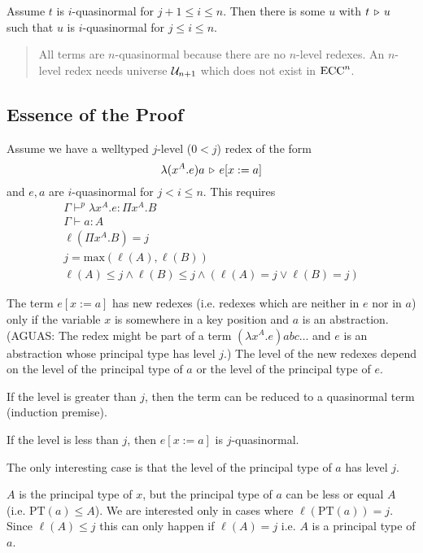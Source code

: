Assume $t$ is $i$-quasinormal for $j+1 \le i \le n$. Then there is some $u$
with $t \,\triangleright\, u$ such that $u$ is $i$-quasinormal for $j \le i \le n$.

\begin{quote}
  All terms are $n$-quasinormal because there are no $n$-level redexes. An
  $n$-level redex needs universe ${\cal U}_{n+1}$ which does not exist in $\text{ECC}^n$.
\end{quote}


\subsection{Essence of the Proof}

Assume we have a welltyped $j$-level ($0 < j$) redex of the form
$$
\lambda (x^A.e) a \,\triangleright\, e[x:=a]
$$
and $e,a$ are $i$-quasinormal for $j < i \le n$. This requires
$$
\begin{array}{l}
  \Gamma \vdash^p \lambda x^A.e : \Pi x^A.B
  \\
  \Gamma \vdash a: A
  \\
  \ell(\Pi x^A.B) = j
  \\
  j = \text{max}(\ell(A), \ell(B))
  \\
  \ell(A) \le j \land \ell(B) \le j \land (\ell(A) = j \lor \ell(B) = j)
\end{array}
$$

The term $e[x:=a]$ has new redexes (i.e. redexes which are neither in $e$ nor
in $a$) only if the variable $x$ is somewhere in a key position and $a$ is an
abstraction. (AGUAS: The redex might be part of a term
$(\lambda x^A.e) a b c\ldots$ and $e$ is an abstraction whose principal type
has level $j$.) The level of the new redexes depend on the level of the
principal type of $a$ or the level of the principal type of $e$.

If the level is greater than $j$, then the term can be reduced to a
quasinormal term (induction premise).

If the level is less than $j$, then $e[x:=a]$ is $j$-quasinormal.

The only interesting case is that the level of the principal type of $a$ has
level $j$.


$A$ is the principal type of $x$, but the principal type of $a$ can be less or
equal $A$ (i.e. $\text{PT}(a) \le A$). We are interested only in cases where
$\ell(\text{PT}(a)) = j$. Since $\ell(A) \le j$ this can only happen if
$\ell(A) = j$ i.e. $A$ is a principal type of $a$.



